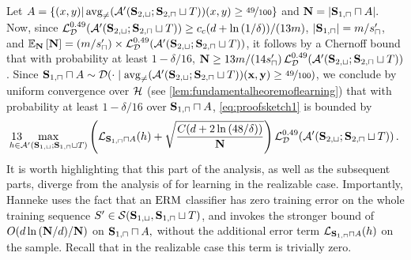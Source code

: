 Let $ A=\{  (x,y)| \operatorname{\mathrm{avg}_{\not=}}(\mathcal{A}'(\mathbf{S}_{2,\sqcup};\mathbf{S}_{2,\sqcap}\sqcup T))(x,y)\geq \nicefrac{49}{100}\}  $ and  $ \mathbf{N}=|\mathbf{S}_{1,\sqcap}\sqcap A|.$   
Now, since $ \operatorname{\mathcal{L}}_{\mathcal{D}}^{0.49}(\mathcal{A}'(\mathbf{S}_{2,\sqcup};\mathbf{S}_{2,\sqcap}\sqcup T)) \geq c_c( d+\ln{\left(1/\delta \right)})/(13m)$, $ |\mathbf{S}_{1,\sqcap}|=m/s_{\sqcap}' $, and $ \e_{\rN}\left[\rN\right]=(m/s_{\sqcap}') \times \linebreak \ls_{\cD}^{0.49}(\cA'(\rS_{2,\sqcup};\rS_{2,\sqcap}\sqcup T)) $, it follows by a Chernoff bound that with probability at least $ 1-\delta/16$, $ \mathbf{N}\geq  13m/(14s_{\sqcap}')\operatorname{\mathcal{L}}_{\mathcal{D}}^{0.49}(\mathcal{A}'(\mathbf{S}_{2,\sqcup};\mathbf{S}_{2,\sqcap}\sqcup T)) $.
Since  $ \mathbf{S}_{1,\sqcap}\sqcap A \sim \mathcal{D}(\cdot\mid \operatorname{\mathrm{avg}_{\not=}}(\mathcal{A}'(\mathbf{S}_{2,\sqcup};\mathbf{S}_{2,\sqcap}\sqcup T))(\mathbf{x},\mathbf{y})\geq \nicefrac{49}{100}) $, we conclude by uniform convergence over $ \mathcal{H} $ (see \cref{lem:fundamentalheoremoflearning}) that with probability at least $ 1-\delta/16 $ over $ \mathbf{S}_{1,\sqcap}\sqcap A $, \cref{eq:proofsketch1} is bounded by 
\begin{align}\label{eq:proofsketch2}
    13\negmedspace\negmedspace\negmedspace\negmedspace\negmedspace\negmedspace\max_{h\in\mathcal{A}'(\mathbf{S}_{1,\sqcup};\mathbf{S}_{1,\sqcap}\sqcup T)} \left( \operatorname{\mathcal{L}}_{\mathbf{S}_{1,\sqcap}\sqcap A}(h)+\sqrt{\frac{C(d+2\ln{\left(48/\delta \right)})}{\mathbf{N}}}\right)\operatorname{\mathcal{L}}_{\mathcal{D}}^{0.49}(\mathcal{A}'(\mathbf{S}_{2,\sqcup};\mathbf{S}_{2,\sqcap}\sqcup T)) \,.
\end{align}
It is worth highlighting that this part of the analysis,
as well as the subsequent parts, diverge from the analysis of \citet{hanneke2016optimal} for learning in the realizable case. Importantly, Hanneke uses the fact that an $ \mathrm{ERM} $ classifier has zero training error on the whole training sequence $ S'\in \mathcal{S}(\mathbf{S}_{1,\sqcup}, \mathbf{S}_{1,\sqcap}\sqcup T) $, and  
invokes the stronger bound of $ O(d\ln{\left(\mathbf{N}/d \right)}/\mathbf{N})$ on $ \mathbf{S}_{1,\sqcap}\sqcap A, $ without the additional error term $ \operatorname{\mathcal{L}}_{\mathbf{S}_{1,\sqcap}\sqcap A}(h) $ on the sample. Recall that in the realizable case this term is trivially zero. 

